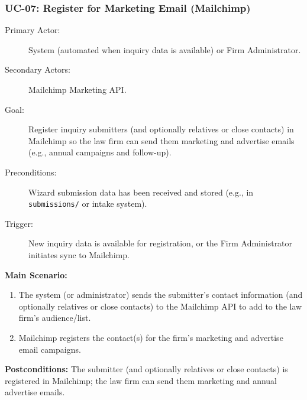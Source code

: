 \documentclass{article}
\begin{document}
\subsubsection{UC-07: Register for Marketing Email (Mailchimp)}\label{uc:07}
\begin{description}
  \item[Primary Actor:] System (automated when inquiry data is available) or Firm Administrator.
  \item[Secondary Actors:] Mailchimp Marketing API.
  \item[Goal:] Register inquiry submitters (and optionally relatives or close contacts) in Mailchimp so the law firm can send them marketing and advertise emails (e.g., annual campaigns and follow-up).
  \item[Preconditions:] Wizard submission data has been received and stored (e.g., in \texttt{submissions/} or intake system).
  \item[Trigger:] New inquiry data is available for registration, or the Firm Administrator initiates sync to Mailchimp.
\end{description}
\textbf{Main Scenario:}
\begin{enumerate}
  \item The system (or administrator) sends the submitter's contact information (and optionally relatives or close contacts) to the Mailchimp API to add to the law firm's audience/list.
  \item Mailchimp registers the contact(s) for the firm's marketing and advertise email campaigns.
\end{enumerate}
\textbf{Postconditions:} The submitter (and optionally relatives or close contacts) is registered in Mailchimp; the law firm can send them marketing and annual advertise emails.


\newpage
\end{document}
